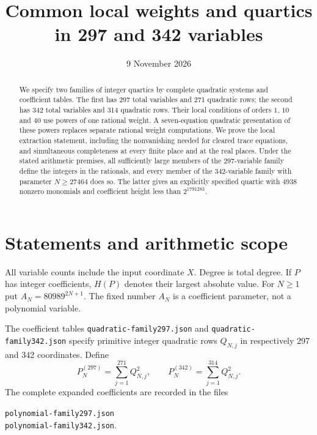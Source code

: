 \documentclass[11pt,a4paper]{article}
\title{Common local weights and quartics in 297 and 342 variables}
\author{}\date{9 November 2026}
\theoremstyle{remark}\newtheorem{remark}[theorem]{Remark}
\begin{document}
\maketitle
\begin{abstract}
We specify two families of integer quartics by complete quadratic systems
and coefficient tables. The first has 297 total variables and 271 quadratic
rows; the second has 342 total variables and 314 quadratic rows. Their
local conditions of orders $1$, $10$ and $40$ use powers of one rational
weight. A seven-equation quadratic presentation of these powers replaces
separate rational weight computations. We prove the local extraction
statement, including the nonvanishing needed for cleared trace equations,
and simultaneous completeness at every finite place and at the real places.
Under the stated arithmetic premises, all sufficiently large members of
the 297-variable family define the integers in the rationals, and every
member of the 342-variable family with parameter $N\ge27464$ does so.
The latter gives an explicitly specified quartic with 4938 nonzero monomials
and coefficient height less than $2^{1791283}$.
\end{abstract}

\section{Statements and arithmetic scope}
All variable counts include the input coordinate $X$. Degree is total
degree. If $P$ has integer coefficients, $H(P)$ denotes their largest
absolute value. For $N\ge1$ put $A_N=80989^{2N+1}$. The fixed number
$A_N$ is a coefficient parameter, not a polynomial variable.

The coefficient tables \nolinkurl{quadratic-family297.json} and
\nolinkurl{quadratic-family342.json} specify primitive integer quadratic
rows $Q_{N,j}$ in respectively 297 and 342 coordinates. Define
\[
 P_N^{(297)}=\sum_{j=1}^{271}Q_{N,j}^2,
 \qquad P_N^{(342)}=\sum_{j=1}^{314}Q_{N,j}^2.
\]
The complete expanded coefficients are recorded in the files
\begin{center}
\nolinkurl{polynomial-family297.json}\\
\nolinkurl{polynomial-family342.json}.
\end{center}
\end{document}
